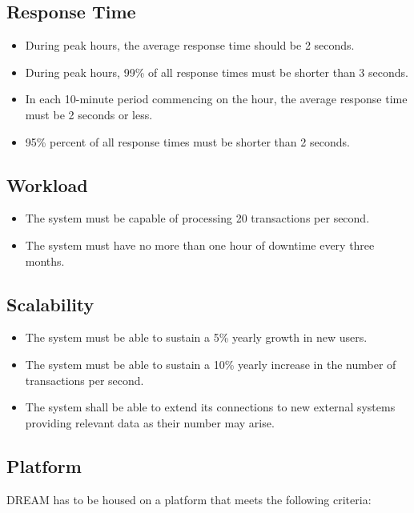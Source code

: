 \subsection{Response Time}

\begin{itemize}
    \item During peak hours, the average response time should be 2 seconds.
    \item During peak hours, 99\% of all response times must be shorter than 3 seconds.
    \item In each 10-minute period commencing on the hour, the average response time must be 2 seconds or less.
    \item 95\% percent of all response times must be shorter than 2 seconds.
\end{itemize}
 
\subsection{Workload}

\begin{itemize}
    \item The system must be capable of processing 20 transactions per second.
    \item The system must have no more than one hour of downtime every three months.
\end{itemize}

\subsection{Scalability}

\begin{itemize}
    \item The system must be able to sustain a 5\% yearly growth in new users.
    \item The system must be able to sustain a 10\% yearly increase in the number of transactions per second.
    \item The system shall be able to extend its connections to new external systems providing relevant data as their number may arise.
\end{itemize}

\subsection{Platform}

DREAM has to be housed on a platform that meets the following criteria:

